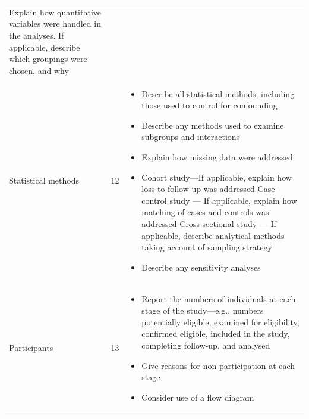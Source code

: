 \documentclass[]{book}
\providecommand{\tightlist}{%
  \setlength{\itemsep}{0pt}\setlength{\parskip}{0pt}}
\begin{document}
\begin{longtable}[]{@{}lll@{}}
\begin{minipage}[t]{0.40\columnwidth}
Explain how quantitative
variables were handled in the
analyses. If applicable,
describe which groupings were
chosen, and why\strut
\end{minipage}\tabularnewline
\begin{minipage}[t]{0.34\columnwidth}\raggedright
Statistical methods\strut
\end{minipage} & \begin{minipage}[t]{0.17\columnwidth}\raggedright
12\strut
\end{minipage} & \begin{minipage}[t]{0.40\columnwidth}\raggedright
\begin{itemize}
\tightlist
\item
  Describe all statistical
  methods, including those used
  to control for confounding
\item
  Describe any methods used to
  examine subgroups and
  interactions
\item
  Explain how missing data
  were addressed
\item
  Cohort study---If
  applicable, explain how loss
  to follow-up was addressed
  Case-control study --- If
  applicable, explain how
  matching of cases and controls
  was addressed
  Cross-sectional study --- If
  applicable, describe
  analytical methods taking
  account of sampling strategy
\item
  Describe any sensitivity
  analyses
\end{itemize}\strut
\end{minipage}\tabularnewline
\begin{minipage}[t]{0.34\columnwidth}\raggedright
Participants\strut
\end{minipage} & \begin{minipage}[t]{0.17\columnwidth}\raggedright
13\strut
\end{minipage} & \begin{minipage}[t]{0.40\columnwidth}\raggedright
\begin{itemize}
\tightlist
\item
  Report the numbers of
  individuals at each stage of
  the study---e.g., numbers
  potentially eligible, examined
  for eligibility, confirmed
  eligible, included in the
  study, completing follow-up,
  and analysed
\item
  Give reasons for
  non-participation at each
  stage
\item
  Consider use of a flow
  diagram
\end{itemize}\strut
\end{minipage}\tabularnewline

\end{longtable}
\end{document}
